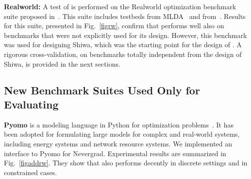 {\textbf{Realworld:}}
\label{b4}
{A test of \ngoptq{} is performed on the Realworld optimization benchmark suite proposed in~\cite{nevergrad}. This suite includes testbeds from MLDA~\cite{mlda} and from~\cite{versatile}. Results for this suite, presented in  Fig.~\ref{figrw}, confirm that \ngoptq{} performs well also on benchmarks that were not explicitly used for its design. However, this benchmark was used for designing Shiwa, which was the starting point for the design of \ngoptq{}. A rigorous cross-validation, on benchmarks {totally} independent from the design of Shiwa, is provided in {the} next sections.}

\subsection{New Benchmark Suites Used Only for Evaluating \ngoptq{}}%


{\textbf{ Pyomo}}\label{b5}
 is a modeling language in Python for optimization problems~\cite{pyomo}.
It has been adopted for formulating large models for complex and real-world systems, including energy systems and network resource systems.
We implemented an interface to Pyomo for Nevergrad. %
Experimental results are summarized in Fig.~\ref{figaddrw}. They show that \ngoptq{} also performs decently in discrete settings and in constrained cases. %


